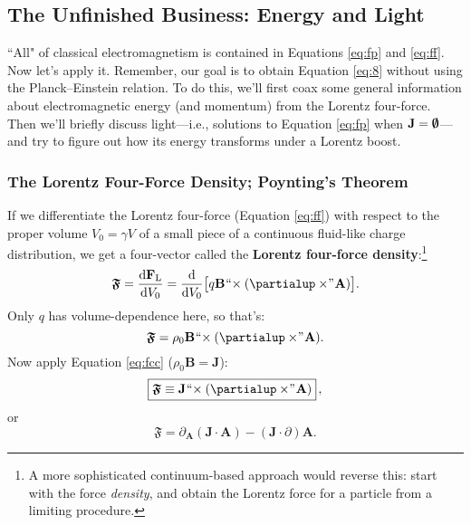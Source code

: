 \documentclass[12pt]{article}
\renewcommand{\vv}[1]{\mathbf{#1}}
\newcommand{\dd}[1]{\mathrm{d}#1}
\begin{document}
\subsection{The Unfinished Business: Energy and Light}

``All" of classical electromagnetism is contained in Equations \ref{eq:fp} and \ref{eq:ff}. Now let's apply it. Remember, our goal is to obtain Equation \ref{eq:8} without using the Planck--Einstein relation. To do this, we'll first coax some general information about electromagnetic energy (and momentum) from the Lorentz four-force. Then we'll briefly discuss light---i.e., solutions to Equation \ref{eq:fp} when $\vv J = \textrm{\mbox{\boldmath $\emptyset$}}$---and try to figure out how its energy transforms under a Lorentz boost.

\subsubsection{The Lorentz Four-Force Density; Poynting's Theorem}\label{sssec:lffd}

If we differentiate the Lorentz four-force (Equation \ref{eq:ff}) with respect to the proper volume ${V_0 = \gamma V}$ of a small piece of a continuous fluid-like charge distribution, we get a four-vector called the \textbf{Lorentz four-force density}:\footnote{A more sophisticated continuum-based approach would reverse this: start with the force \emph{density}, and obtain the Lorentz force for a particle from a limiting procedure.}
\begin{equation*}
\bm{\mathfrak{F}} = \dfrac{\dd \vv F_{\mathrm{L}}}{\dd V_0} = \dfrac{\dd}{\dd V_0} \bigl[ q \vv B \mkern1mu `` \mkern-4mu \times (\partialup \times \mkern-4mu " \mkern1mu \vv A) \bigr] .
\end{equation*}
Only $q$ has volume-dependence here, so that's:
\begin{equation*}
\bm{\mathfrak{F}} = \rho_0 \vv B \mkern1mu `` \mkern-4mu \times (\partialup \times \mkern-4mu " \mkern1mu \vv A) .
\end{equation*}
Now apply Equation \ref{eq:fcc} ($\rho_0 \vv B = \vv J$):
\begin{equation}\label{eq:lffd}
\boxed{ \bm{\mathfrak{F}} \equiv \vv J \mkern1mu `` \mkern-4mu \times (\partialup \times \mkern-4mu " \mkern1mu \vv A) } \, ,
\end{equation}
or
\begin{equation*}
\bm{\mathfrak{F}} = \partialup_{\vv A} (\vv J \cdot \vv A) - ( \vv J \cdot \partialup) \vv A .
\end{equation*}
\end{document}

